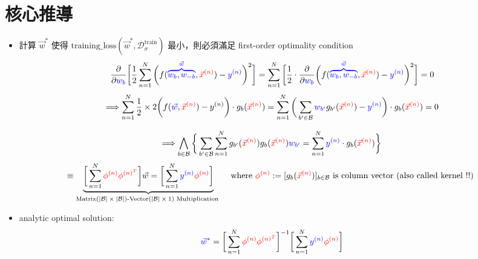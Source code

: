 \documentclass{article}
\begin{document}
\begin{CJK}{UTF8}{bsmi}
\begin{itemize}
\end{itemize}

\newpage 
\section{核心推導}
\begin{itemize}
\item 計算 $\vec{w}^{*}$ 使得  $\text{training\_loss$(\vec{w}^{*},\mathcal{D}^{\text{train}}_{\sigma})$}$ 最小，則必須滿足 first-order optimality condition 
$$  \frac{\partial}{\partial \color{blue}w_b} \bigg[ \frac{1}{2}  \sum_{n=1}^{N}   \bigg(f({\color{blue}\overbrace{w_b,w_{-b}}^{\vec{w}}},{\color{red}\vec{x}^{(n)}}) - {\color{blue}y^{(n)} }\bigg)^2 \bigg] =\sum_{n=1}^{N}\bigg[ \frac{1}{2} \cdot \frac{\partial}{\partial \color{blue}w_b}  \bigg(f({\color{blue}\overbrace{w_b,w_{-b}}^{\vec{w}}},{\color{red}\vec{x}^{(n)}}) - {\color{blue}y^{(n)} }\bigg)^2 \bigg] = 0 $$ $$\Longrightarrow \sum_{n=1}^{N} \frac{1}{2} \times 2\bigg( f({\color{blue}\vec{w}},{\color{red}\vec{x}^{(n)}}) - y^{(n)} \bigg)\cdot g_b({\color{red}\vec{x}^{(n)}}) = \sum_{n=1}^{N} \bigg( \sum_{b' \in \mathcal{B}} {\color{blue}w_{b'}} g_{b'}({\color{red}\vec{x}^{(n)}}) - {\color{blue} y^{(n)}} \bigg) \cdot g_{b}({\color{red}\vec{x}^{(n)}})   = 0 $$

$$ \Longrightarrow  \bigwedge_{b \in \mathcal{B}} \bigg\{ \sum_{b' \in \mathcal{B}}   \sum_{n=1}^{N}g_{b'}({\color{red}\vec{x}^{(n)}})g_{b}({\color{red}\vec{x}^{(n)}}) {\color{blue}w_{b'}} = \sum_{n=1}^{N}  {\color{blue}y^{(n)}} \cdot  g_{b}({\color{red}\vec{x}^{(n)}}) \bigg\} $$ $$ \equiv \underbrace{  \bigg[\sum_{n=1}^{N} {\color{red}\phi^{(n)}\phi^{(n)^T}} \bigg] \vec{w} = \bigg[\sum_{n=1}^{N} {\color{blue}y^{(n)}} {\color{red}\phi^{(n)}} \bigg]}_{\text{Matrix$(|\mathcal{B}| \times |\mathcal{B}|)$-Vector$(|\mathcal{B}| \times 1)$ Multiplication }} \quad \text{where } {\color{red}\phi^{(n)}} := [g_{b}({\color{red}\vec{x}^{(n)}})]_{b \in \mathcal{B}} \text{ is column vector (also called kernel !!) }   $$

\item analytic optimal solution:
$$ {\color{blue} \vec{w}^{*}} =   \bigg[\sum_{n=1}^{N} {\color{red}\phi^{(n)}\phi^{(n)^T}} \bigg]^{-1}\bigg[\sum_{n=1}^{N} {\color{blue}y^{(n)}} {\color{red}\phi^{(n)}} \bigg]   $$

\end{itemize}

\end{CJK}
\end{document}

